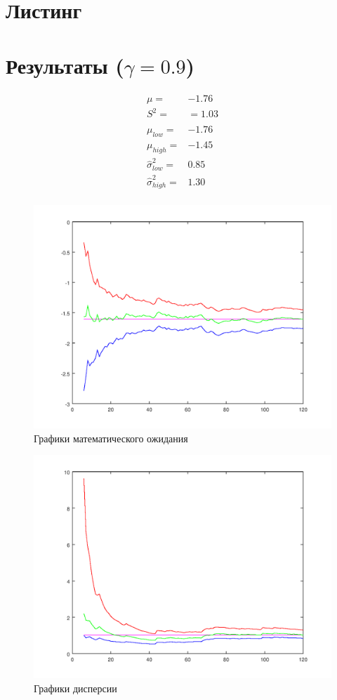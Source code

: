 \documentclass[a4paper,11pt,russian]{extreport}
\begin{document}
	
	
	\chapter{Листинг}
	
	
	\chapter{\boldmath Результаты ($\gamma = 0.9$)}
	\begin{align*}
	\mu =& -1.76 \\
	S^2 =& = 1.03 \\ \\
	\mu_{low} =& -1.76 \\
	\mu_{high} =& -1.45 \\
	\hat{\sigma}^2_{low} =&  0.85 \\
	\hat{\sigma}^2_{high} =& 1.30 \\
	\end{align*}
	
	\begin{figure}
		\includegraphics[width=\linewidth]{../img/3.png}
		\caption{Графики математического ожидания}
		\label{fig:1}
	\end{figure}
	
	\begin{figure}
		\includegraphics[width=\linewidth]{../img/2.png}
		\caption{Графики дисперсии}
		\label{fig:2}
	\end{figure}
	
		
	
\end{document}
